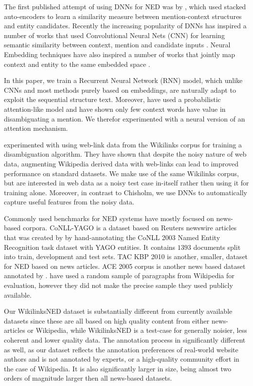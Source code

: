 \documentclass[11pt]{article}
\begin{document}
The first published attempt of using DNNs for NED was by , which used stacked auto-encoders to learn a similarity measure between mention-context structures and entity candidates. Recently the increasing popularity of DNNs has inspired a number of works that used Convolutional Neural Nets (CNN) for learning semantic similarity between context, mention and candidate inputs \cite{sun2015modeling,francis2016capturing}. Neural Embedding techniques have also inspired a number of works that jointly map context and entity to the same embedded space \cite{yamada2016joint,Melamud2014}.

In this paper, we train a Recurrent Neural Network (RNN) model, which unlike CNNs and most methods purely based on embeddings, are naturally adapt to exploit the sequential structure text. Moreover,  have used a probabilistic attention-like model and have shown only few context words have value in disambiguating a mention. We therefor experimented with a neural version of an attention mechanism.

 experimented with using web-link data from the Wikilinks corpus \cite{singh12:wiki-links} for training a disambiguation algorithm. They have shown that despite the noisy nature of web data, augmenting Wikipedia derived data with web-links can lead to improved performance on standard datasets. We make use of the same Wikilinks corpus, but are interested in web data as a noisy test case in-itself rather then using it for training alone. Moreover, in contrast to Chisholm, we use DNNs to automatically capture useful features from the noisy data.

Commonly used benchmarks for NED systems have mostly focused on news-based corpora. CoNLL-YAGO is a dataset based on Reuters newswire articles that was created by  by hand-annotating the CoNLL 2003 Named Entity Recognition task dataset with YAGO entities. It contains $1393$ documents split into train, development and test sets. TAC KBP 2010 \cite{ji2010overview} is another, smaller, dataset for NED based on news articles. ACE 2005 corpus is another news based dataset annotated by .  have used a random sample of paragraphs from Wikipedia for evaluation, however they did not make the precise sample they used publicly available. 

Our WikilinksNED dataset is substantially different from currently available datasets since these are all based on high quality content from either news-articles or Wikipedia, while WikilinksNED is a test-case for generally noisier, less coherent and lower quality data. The annotation process in significantly different as well, as our dataset reflects the annotation preferences of real-world website authors and is not annotated by experts, or a high-quality community effort in the case of Wikipedia. It is also significantly larger in size, being almost two orders of magnitude larger then all news-based datasets.
\end{document}

